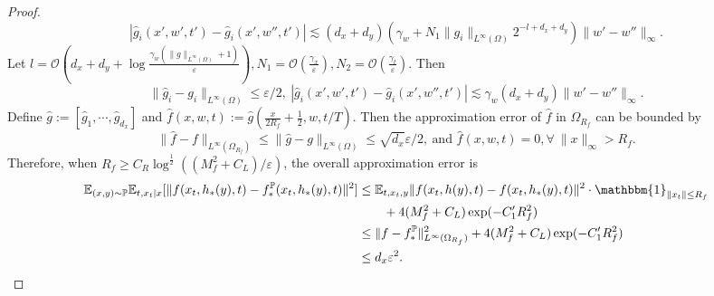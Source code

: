 \documentclass[11pt]{article}
\numberwithin{equation}{section}
\renewcommand{\P}{\mathbb{P}}
\begin{document}
\begin{proof}
    \begin{equation}
        |\widehat{g}_i(x',w',t')-\widehat{g}_i(x',w'',t')|\lesssim (d_x+d_y)\left(\gamma_w+N_1\|g_i\|_{L^\infty(\Omega)}2^{-l+d_x+d_y}\right)\|w'-w''\|_{\infty}.
    \end{equation}
    Let $l=\mathcal{O}\left(d_x+d_y+\log\frac{\gamma_w(\|g\|_{L^\infty(\Omega)}+1)}{\varepsilon}\right), N_1=\mathcal{O}\left(\frac{\gamma_x}{\varepsilon}\right),N_2=\mathcal{O}\left(\frac{\gamma_t}{\varepsilon}\right)$.
    Then
    \begin{equation}\label{eq:err_nn_g}
        \|\widehat{g}_i-g_i\|_{L^\infty(\Omega)}\leq \varepsilon/2,\ |\widehat{g}_i(x',w',t')-\widehat{g}_i(x',w'',t')|\lesssim \gamma_w(d_x+d_y)\|w'-w''\|_\infty.
    \end{equation}
    Define $\widehat{g}:=[\widehat{g}_1,\cdots,\widehat{g}_{d_x}]$ and $\widehat{f}(x,w,t):=\widehat{g}\left(\frac{x}{2R_f}+\frac{1}{2},w,t/T\right)$.
    Then the approximation error of $\widehat{f}$ in $\Omega_{R_f}$ can be bounded by
    \begin{equation}
        \|\widehat{f}-f\|_{L^\infty(\Omega_{R_f})}\leq\|\widehat{g}-g\|_{L^\infty(\Omega)}\leq \sqrt{d_x}\varepsilon/2,\ \text{and }\widehat{f}(x,w,t)=0, \forall\ \|x\|_{\infty}>R_f.
    \end{equation}
    Therefore, when $R_f\geq C_R\log^{\frac{1}{2}}\left((M_f^2+C_L)/\varepsilon\right)$, the overall approximation error is
    \begin{equation}
        \begin{aligned}
            \E_{(x,y)\sim\P}\E_{t,x_t|x} [\|f(x_t,h_*(y),t)-f_*^\P(x_t,h_*(y),t)\|^2]
            &\leq \E_{t,x_t,y} \|f(x_t,h(y),t)-f(x_t,h_*(y),t)\|^2\cdot \mathbbm{1}_{\|x_t\|\leq R_f} \\
            &\qquad + 4(M_f^2+C_L)\exp(-C_1'R_f^2) \\
            &\leq \|f-f_*^\P\|_{L^\infty(\Omega_{R_f})}^2 + 4(M_f^2+C_L)\exp(-C_1'R_f^2) \\
            &\leq d_x\varepsilon^2.
        \end{aligned}
    \end{equation}
    

\end{proof}
\end{document}
